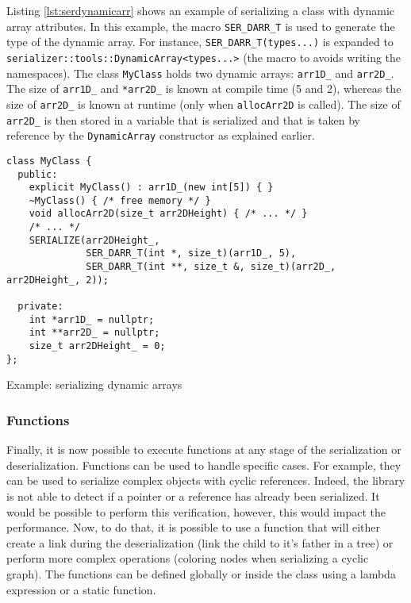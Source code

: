 Listing \ref{lst:serdynamicarr} shows an example of serializing a class with
dynamic array attributes. In this example, the macro \texttt{SER\_DARR\_T} is
used to generate the type of the dynamic array. For instance,
\texttt{SER\_DARR\_T(types...)} is expanded to
\texttt{serializer::tools::DynamicArray<types...>} (the macro to avoids writing
the namespaces). The class \texttt{MyClass} holds two dynamic arrays:
\texttt{arr1D\_} and \texttt{arr2D\_}. The size of \texttt{arr1D\_} and
\texttt{*arr2D\_} is known at compile time (5 and 2), whereas the size of
\texttt{arr2D\_} is known at runtime (only when \texttt{allocArr2D} is called).
The size of \texttt{arr2D\_} is then stored in a variable that is serialized and
that is taken by reference by the \texttt{DynamicArray} constructor as explained
earlier.

\begin{listing}[ht!]
\begin{verbatim}
class MyClass {
  public:
    explicit MyClass() : arr1D_(new int[5]) { }
    ~MyClass() { /* free memory */ }
    void allocArr2D(size_t arr2DHeight) { /* ... */ }
    /* ... */
    SERIALIZE(arr2DHeight_,
              SER_DARR_T(int *, size_t)(arr1D_, 5),
              SER_DARR_T(int **, size_t &, size_t)(arr2D_, arr2DHeight_, 2));

  private:
    int *arr1D_ = nullptr;
    int **arr2D_ = nullptr;
    size_t arr2DHeight_ = 0;
};
\end{verbatim}
\caption{Example: serializing dynamic arrays}
\label{lst:serdynamicarr}
\end{listing}

\clearpage{}
\subsubsection{Functions}

Finally, it is now possible to execute functions at any stage of the
serialization or deserialization. Functions can be used to handle specific
cases. For example, they can be used to serialize complex objects with cyclic
references. Indeed, the library is not able to detect if a pointer or a
reference has already been serialized. It would be possible to perform this
verification, however, this would impact the performance. Now, to do that, it
is possible to use a function that will either create a link during the
deserialization (link the child to it's father in a tree) or perform more
complex operations (coloring nodes when serializing a cyclic graph). The
functions can be defined globally or inside the class using a lambda expression
or a static function.


